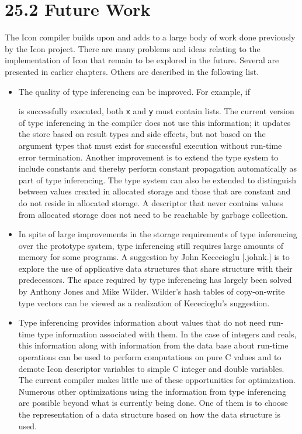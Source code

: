 \section[25.2 Future Work]{25.2 Future Work}

The Icon compiler builds upon and adds to a large body of work done
previously by the Icon project. There are many problems and ideas
relating to the implementation of Icon that remain to be explored in
the future. Several are presented in earlier chapters. Others are
described in the following list.

\liststyleLxxxv
\begin{itemize}
\item 
The quality of type inferencing can be improved. For example, if 


\noindent
is successfully executed, both \texttt{x} and \texttt{y} must contain
lists. The current version of type inferencing in the compiler does
not use this information; it updates the store based on result types
and side effects, but not based on the argument types that must exist
for successful execution without run-time error termination. Another
improvement is to extend the type system to include constants and
thereby perform constant propagation automatically as part of type
inferencing.  The type system can also be extended to distinguish
between values created in allocated storage and those that are
constant and do not reside in allocated storage. A descriptor that
never contains values from allocated storage does not need to be
reachable by garbage collection.

\item In spite of large improvements in the storage requirements of
type inferencing over the prototype system, type inferencing still requires
large amounts of memory for some programs. A suggestion by John
Kececioglu [.johnk.] is to explore the use of applicative data
structures that share structure with their predecessors. The space
required by type inferencing has largely been solved by Anthony Jones
and Mike Wilder. Wilder's hash tables of copy-on-write type vectors
can be viewed as a realization of Kececioglu's suggestion.

\item Type inferencing provides information about values that do not
need run-time type information associated with them. In the case of
integers and reals, this information along with information from the
data base about run-time operations can be used to perform
computations on pure C values and to demote Icon descriptor variables
to simple C integer and double variables. The current compiler makes
little use of these opportunities for optimization. Numerous other
optimizations using the information from type inferencing are possible
beyond what is currently being done. One of them is to choose the
representation of a data structure based on how the data structure is used.


\end{itemize}
